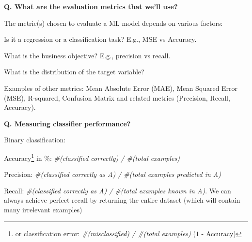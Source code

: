 \begin{frame}[fragile]{\textbf{Q. What are the evaluation metrics that we'll use?}}
\begin{wideitemize}
  \item The metric(s) chosen to evaluate a ML model depends on various factors:\medskip
  \begin{wideitemize}
    \item Is it a regression or a classification task? E.g., MSE vs Accuracy.
    \item What is the business objective? E.g., precision vs recall.
    \item What is the distribution of the target variable?
  \end{wideitemize}
  \item Examples of other metrics: Mean Absolute Error (MAE), Mean Squared Error
    (MSE), R-squared, Confusion Matrix and related metrics (Precision, Recall, Accuracy).
\end{wideitemize}
\end{frame}



\begin{frame}[fragile]{\textbf{Q. Measuring classifier performance?}}
  \begin{wideitemize}
  \item Binary classification:\medskip
    \begin{wideitemize}
    \item Accuracy\footnote{or classification error: \textit{\#(misclassified) /
          \#(total examples)} ($1$ - Accuracy)} in \%: \textit{\#(classified correctly) / \#(total examples)}
    \item Precision: \textit{\#(classified correctly as A) / \#(total examples
        predicted in A)}
    \item Recall: \textit{\#(classified correctly as A) / \#(total examples
        known in A)}. {\footnotesize We can always achieve perfect recall by
        returning the entire dataset (which will contain many irrelevant examples)}
    \end{wideitemize}
  \end{wideitemize}
\end{frame}




